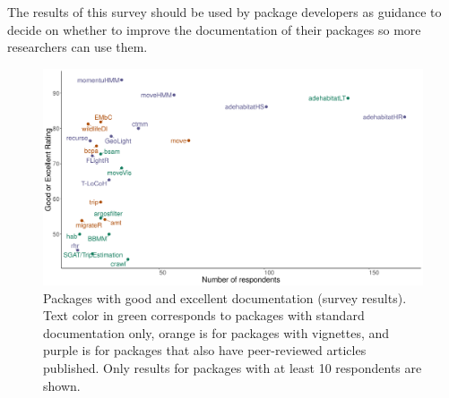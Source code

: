 \documentclass[a4paper,12pt]{article}
\newcommand{\Rpkg}[1]{\texttt{#1}}
\begin{document}
	The results of this survey should be used by package developers as guidance to decide on whether to improve the documentation of their packages so more researchers can use them. 
	
	\begin{figure}
		\centering
		\includegraphics[width=1\textwidth]{./mes_images/Rating_V_Use1.png}
		\caption{\label{fig:DocParticipants} Packages with good and excellent documentation (survey results). Text color in green corresponds to packages with standard documentation only, orange is for packages with vignettes, and purple is for packages that also have peer-reviewed articles published. Only results for packages with at least 10 respondents are shown. %
		}
	\end{figure}
	
	
\end{document}
